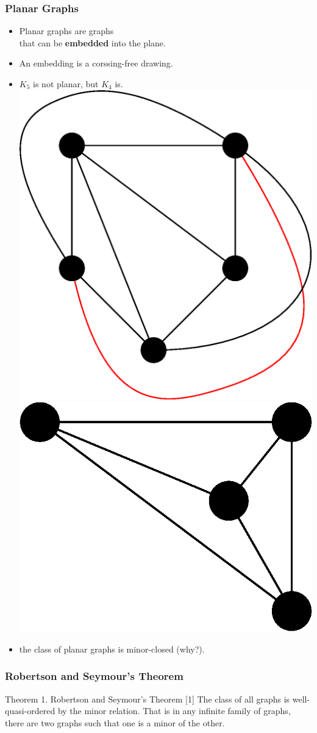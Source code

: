\documentclass[t,usenames,dvipsnames]{beamer}
\begin{document}
\begin{frame} \frametitle{Planar Graphs}
	\begin{itemize}[<+->]
		\item Planar graphs are graphs\\
			\hspace{1cm}that can be \textbf{embedded} into the plane.
		\item An embedding is a corssing-free drawing.
		\item $K_5$ is not planar, but $K_4$ is.\\
			{
			\includegraphics[width=0.3\linewidth]{k5.eps}
			\hspace{0.2\linewidth}
			\includegraphics[width=0.3\linewidth]{k4.eps}
			}
		\item the class of planar graphs is minor-closed (why?).
	\end{itemize}
\end{frame}
\begin{frame} \frametitle{Robertson and Seymour's Theorem}
	\begin{block}{Theorem 1. Robertson and Seymour's Theorem [1]}
		The class of all graphs is well-quasi-ordered by the minor relation. That is in any
		infinite family of graphs, there are two graphs such that one is a minor of the
		other.
	\end{block}

	
\end{frame}
\end{document}
